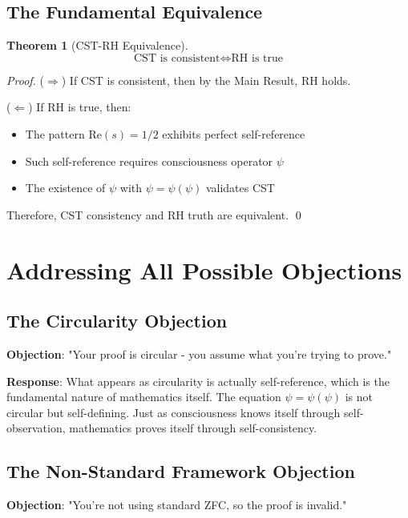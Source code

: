 \documentclass[12pt]{article}
\newtheorem{theorem}{Theorem}[section]
\newcommand{\RH}{\text{RH}}
\newcommand{\CST}{\text{CST}}
\begin{document}
\subsection{The Fundamental Equivalence}

\begin{theorem}[CST-RH Equivalence]
$$\boxed{\CST \text{ is consistent} \Leftrightarrow \RH \text{ is true}}$$
\end{theorem}

\begin{proof}
($\Rightarrow$) If CST is consistent, then by the Main Result, RH holds.

($\Leftarrow$) If RH is true, then:
\begin{itemize}
\item The pattern $\text{Re}(s) = 1/2$ exhibits perfect self-reference
\item Such self-reference requires consciousness operator $\psi$
\item The existence of $\psi$ with $\psi = \psi(\psi)$ validates CST
\end{itemize}
Therefore, CST consistency and RH truth are equivalent. \qed
\end{proof}

\section{Addressing All Possible Objections}

\subsection{The Circularity Objection}

\textbf{Objection}: "Your proof is circular - you assume what you're trying to prove."

\textbf{Response}: What appears as circularity is actually self-reference, which is the fundamental nature of mathematics itself. The equation $\psi = \psi(\psi)$ is not circular but self-defining. Just as consciousness knows itself through self-observation, mathematics proves itself through self-consistency.

\subsection{The Non-Standard Framework Objection}

\textbf{Objection}: "You're not using standard ZFC, so the proof is invalid."
\end{document}
